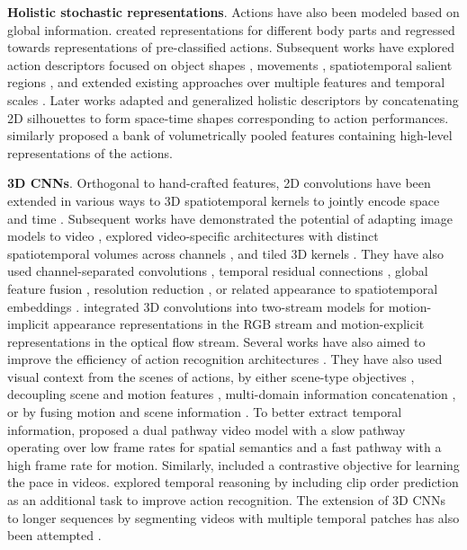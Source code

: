 \noindent
\textbf{Holistic stochastic representations}. Actions have also been modeled based on global information. \citet{efros2003recognizing} created representations for different body parts and regressed towards representations of pre-classified actions. Subsequent works have explored action descriptors focused on object shapes \citep{gorelick2006shape,jia2008human}, movements \citep{sun2009action}, spatiotemporal salient regions \citep{wong2007extracting}, and extended existing approaches over multiple features and temporal scales \citep{amer2012sum,liu2008recognizing,zelnik2001event,yang2020temporal}. Later works \citep{blank2005actions} adapted and generalized holistic descriptors \citep{gorelick2006shape} by concatenating 2D silhouettes to form space-time shapes corresponding to action performances. \citet{sadanand2012action} similarly proposed a bank of volumetrically pooled features containing high-level representations of the actions. 


\noindent
\textbf{3D CNNs}. Orthogonal to hand-crafted features, 2D convolutions have been extended in various ways to 3D spatiotemporal kernels to jointly encode space and time \citep{baccouche2011sequential,ji20123d,taylor2010convolutional,tran2015learning}. Subsequent works have demonstrated the potential of adapting image models to video \citep{hara2018can}, explored video-specific architectures with distinct spatiotemporal volumes across channels \citep{chen2018multi}, and tiled 3D kernels \citep{hegde2018morph}. They have also used channel-separated convolutions \citep{jiang2019stm,luo2019grouped,tran2019video}, temporal residual connections \citep{qiu2017learning}, global feature fusion \citep{qiu2019learning}, resolution reduction \citep{chen2019drop,stergiou2021multi}, or related appearance to spatiotemporal embeddings \citep{wang2018appearance,zhou2018mict}. \citet{carreira2017quo} integrated 3D convolutions into two-stream models for motion-implicit appearance representations in the RGB stream and motion-explicit representations in the optical flow stream. Several works have also aimed to improve the efficiency of action recognition architectures \citep{feichtenhofer2020x3d,kondratyuk2021movinets,liu2022convnet}. They have also used visual context from the scenes of actions, by either scene-type objectives \citep{choi2019can}, decoupling scene and motion features \citep{wang2021enhancing}, multi-domain information concatenation \citep{kapidis2021multi}, or by fusing motion and scene information \citep{stergiou2021learn}. To better extract temporal information, \citet{feichtenhofer2019slowfast} proposed a dual pathway video model with a slow pathway operating over low frame rates for spatial semantics and a fast pathway with a high frame rate for motion. Similarly, \citet{wang2020self} included a contrastive objective for learning the pace in videos. \citet{xu2019self} explored temporal reasoning by including clip order prediction as an additional task to improve action recognition. The extension of 3D CNNs to longer sequences by segmenting videos with multiple temporal patches has also been attempted \citep{ji2020action,hussein2019timeception,varol2017long}.


